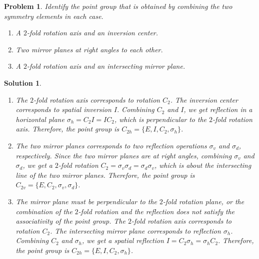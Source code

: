 \documentclass[UTF8,10pt,a4paper]{article}
\theoremstyle{Problem}
\newtheorem{prob}{Problem}
\theoremstyle{Solution}
\newtheorem*{sol}{Solution}
\begin{document}
\thispagestyle{FirstPageStyle}
\begin{prob}
    Identify the point group that is obtained by combining the two symmetry elements in each case.
    \begin{enumerate}
        \item[(a)] A $2$-fold rotation axis and an inversion center.
        \item[(b)] Two mirror planes at right angles to each other.
        \item[(c)] A $2$-fold rotation axis and an intersecting mirror plane.
    \end{enumerate}
\end{prob}
\begin{sol}
    \begin{enumerate}
        \item[(a)] The $2$-fold rotation axis corresponds to rotation $C_2$. The inversion center corresponds to spatial inversion $I$. Combining $C_2$ and $I$, we get reflection in a horizontal plane $\sigma_h=C_2I=IC_2$, which is perpendicular to the $2$-fold rotation axis. Therefore, the point group is $C_{2h}=\{E,I,C_2,\sigma_h\}$.
        \item[(b)] The two mirror planes corresponds to two reflection operations $\sigma_v$ and $\sigma_d$, respectively. Since the two mirror planes are at right angles, combining $\sigma_v$ and $\sigma_d$, we get a $2$-fold rotation $C_2=\sigma_v\sigma_d=\sigma_d\sigma_v$, which is about the intersecting line of the two mirror planes. Therefore, the point group is $C_{2v}=\{E,C_2,\sigma_v,\sigma_d\}$.
        \item[(c)] The mirror plane must be perpendicular to the $2$-fold rotation plane, or the combination of the $2$-fold rotation and the reflection does not satisfy the associativity of the point group. The $2$-fold rotation axis corresponds to rotation $C_2$. The intersecting mirror plane corresponds to reflection $\sigma_h$. Combining $C_2$ and $\sigma_h$, we get a spatial reflection $I=C_2\sigma_h=\sigma_hC_2$. Therefore, the point group is $C_{2h}=\{E,I,C_2,\sigma_h\}$.
    \end{enumerate}
\end{sol}
\end{document}
